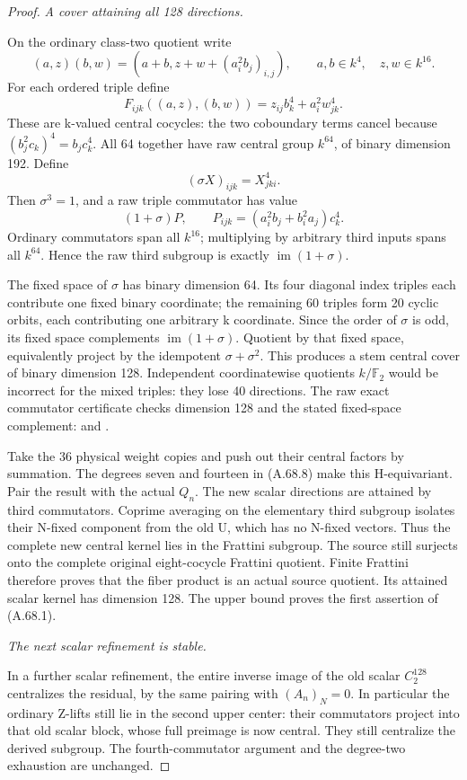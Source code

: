 \begin{proof}
\emph{A cover attaining all 128 directions.}\par
On the ordinary class-two quotient write
\[
 (a,z)(b,w)=
 \left(a+b,z+w+(a_i^2b_j)_{i,j}\right),
 \qquad a,b\in k^4,\quad z,w\in k^{16}.
\]
For each ordered triple define
\[
 F_{ijk}((a,z),(b,w))=z_{ij}b_k^4+a_i^2w_{jk}^4.
 \tag{A.68.8}
\]
These are k-valued central cocycles: the two coboundary terms
cancel because \((b_j^2c_k)^4=b_jc_k^4\). All 64 together
have raw central group \(k^{64}\), of binary dimension 192.
Define
\[
 (\sigma X)_{ijk}=X_{jki}^4.
 \tag{A.68.9}
\]
Then \(\sigma^3=1\), and a raw triple commutator has value
\[
 (1+\sigma)P,\qquad
 P_{ijk}=(a_i^2b_j+b_i^2a_j)c_k^4.
 \tag{A.68.10}
\]
Ordinary commutators span all \(k^{16}\); multiplying by arbitrary
third inputs spans all \(k^{64}\). Hence the raw third subgroup
is exactly \(\operatorname{im}(1+\sigma)\).

The fixed space of \(\sigma\) has binary dimension 64. Its four
diagonal index triples each contribute one fixed binary coordinate;
the remaining 60 triples form 20 cyclic orbits, each contributing
one arbitrary k coordinate. Since the order of \(\sigma\) is odd,
its fixed space complements \(\operatorname{im}(1+\sigma)\).
Quotient by that fixed space, equivalently project by the idempotent
\(\sigma+\sigma^2\). This produces a stem central cover of
binary dimension 128. Independent coordinatewise quotients
\(k/\mathbb F_2\) would be incorrect for the mixed triples:
they lose 40 directions. The raw exact commutator certificate
checks dimension 128 and the stated fixed-space complement:
 and
.

Take the 36 physical weight copies and push out their central
factors by summation. The degrees seven and fourteen in (A.68.8)
make this H-equivariant. Pair the result with the actual \(Q_n\).
The new scalar directions are attained by third commutators.
Coprime averaging on the elementary third subgroup isolates their
N-fixed component from the old U, which has no N-fixed vectors.
Thus the complete new central kernel lies in the Frattini subgroup.
The source still surjects onto the complete original eight-cocycle
Frattini quotient. Finite Frattini therefore proves that the
fiber product is an actual source quotient. Its attained scalar
kernel has dimension 128. The upper bound proves the first
assertion of (A.68.1).

\emph{The next scalar refinement is stable.}\par
In a further scalar refinement, the entire inverse image of the
old scalar \(C_2^{128}\) centralizes the residual, by the same
pairing with \((A_n)_N=0\). In particular the ordinary Z-lifts
still lie in the second upper center: their commutators project
into that old scalar block, whose full preimage is now central.
They still centralize the derived subgroup. The fourth-commutator
argument and the degree-two exhaustion are unchanged.


\end{proof}

